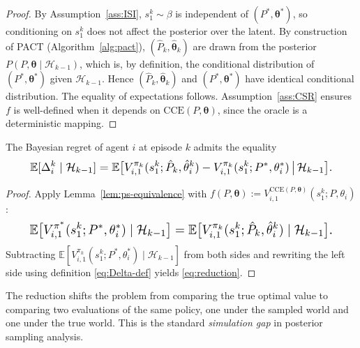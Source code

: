 \begin{proof}
By Assumption~\ref{ass:ISI}, $s_1^k \sim \beta$ is independent of $(P^*, \boldsymbol{\theta}^*)$, so conditioning on $s_1^k$ does not affect the posterior over the latent. By construction of PACT (Algorithm~\ref{alg:pact}), $(\hat{P}_k, \hat{\boldsymbol{\theta}}_k)$ are drawn from the posterior $P(P, \boldsymbol{\theta} \mid \mathcal{H}_{k-1})$, which is, by definition, the conditional distribution of $(P^*, \boldsymbol{\theta}^*)$ given $\mathcal{H}_{k-1}$. Hence $(\hat{P}_k, \hat{\boldsymbol{\theta}}_k)$ and $(P^*, \boldsymbol{\theta}^*)$ have identical conditional distribution. The equality of expectations follows. Assumption~\ref{ass:CSR} ensures $f$ is well-defined when it depends on $\mathrm{CCE}(P, \boldsymbol{\theta})$, since the oracle is a deterministic mapping.
\end{proof}

\begin{lemma}
\label{lem:reduction}
The Bayesian regret of agent $i$ at episode $k$ admits the equality
\begin{equation}\label{eq:reduction}\resizebox{0.9\linewidth}{!}{$\displaystyle \mathbb{E}[\Delta_i^k \mid \mathcal{H}_{k-1}] = \mathbb{E}\big[V_{i,1}^{\pi_k}(s_1^k; \hat{P}_k, \hat{\theta}_i^k) - V_{i,1}^{\pi_k}(s_1^k; P^*, \theta_i^*) \,\big|\, \mathcal{H}_{k-1}\big]. $}\end{equation}
\end{lemma}

\begin{proof}
Apply Lemma~\ref{lem:ps-equivalence} with $f(P, \boldsymbol{\theta}) := V_{i,1}^{\mathrm{CCE}(P, \boldsymbol{\theta})}(s_1^k; P, \theta_i)$:
\begin{equation}\resizebox{0.9\linewidth}{!}{$\displaystyle \mathbb{E}\big[V_{i,1}^{\pi^*}(s_1^k; P^*, \theta_i^*) \mid \mathcal{H}_{k-1}\big] = \mathbb{E}\big[V_{i,1}^{\pi_k}(s_1^k; \hat{P}_k, \hat{\theta}_i^k) \mid \mathcal{H}_{k-1}\big]. $}\end{equation}
Subtracting $\mathbb{E}[V_{i,1}^{\pi_k}(s_1^k; P^*, \theta_i^*) \mid \mathcal{H}_{k-1}]$ from both sides and rewriting the left side using definition \eqref{eq:Delta-def} yields \eqref{eq:reduction}.
\end{proof}

The reduction shifts the problem from comparing the true optimal value to comparing two evaluations of the same policy, one under the sampled world and one under the true world. This is the standard \textit{simulation gap} in posterior sampling analysis.

